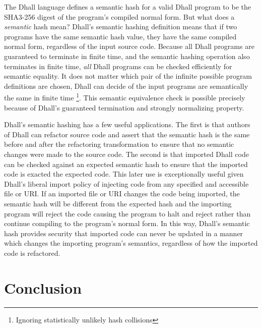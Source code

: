 \documentclass[12pt]{diazessay}
\begin{document}
The Dhall language defines a semantic hash for a valid Dhall program to be the SHA3-256 \cite{dworkin2015sha, bertoni2013keccak} digest of the program's compiled normal form.
But what does a \emph{semantic} hash mean?
Dhall's semantic hashing definition means that if two programs have the same semantic hash value, they have the same compiled normal form, regardless of the input source code.
Because all Dhall programs are guaranteed to terminate in finite time, and the semantic hashing operation also terminates in finite time, \emph{all} Dhall programs can be checked efficiently for semantic equality.
It does not matter which pair of the infinite possible program definitions are chosen, Dhall can decide of the input programs are semantically the same in finite time \footnote{Ignoring statistically unlikely hash collisions}.
This semantic equivalence check is possible precisely because of Dhall's guaranteed termination and strongly normalizing property.

Dhall's semantic hashing has a few useful applications.
The first is that authors of Dhall can refactor source code and assert that the semantic hash is the same before and after the refactoring transformation to ensure that no semantic changes were made to the source code.
The second is that imported Dhall code can be checked against an expected semantic hash to ensure that the imported code is exacted the expected code.
This later use is exceptionally useful given Dhall's liberal import policy of injecting code from any specified and accessible file or URI.
If an imported file or URI changes the code being imported, the semantic hash will be different from the expected hash and the importing program will reject the code causing the program to halt and reject rather than continue compiling to the program's normal form.
In this way, Dhall's semantic hash provides security that imported code can never be updated in a manner which changes the importing program's semantics, regardless of how the imported code is refactored.

\section*{Conclusion}
\end{document}
